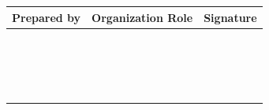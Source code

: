 \begin{center}

\begin{longtable}{|c|c|c|}
    \hline
    \rowcolor{gray}
    \textbf{Prepared by}     &  \textbf{Organization Role}         & \textbf{Signature} \\ \hline
    \endfirsthead
                        &                           &               \\ \hline
                        &                           &               \\ \hline
                        &                           &               \\ \hline
                        &                           &               \\ \hline
                        &                           &               \\ \hline
                        &                           &               \\ \hline
                        &                           &               \\ \hline
                        &                           &               \\ \hline
                        &                           &               \\ \hline
                        &                           &               \\ \hline
                        &                           &               \\ \hline
                        &                           &               \\ \hline
                        &                           &               \\ \hline
                        &                           &               \\ \hline
                        &                           &               \\ \hline
                        &                           &               \\ \hline
                        &                           &               \\ \hline
                        &                           &               \\ \hline

\end{longtable}
\end{center}
